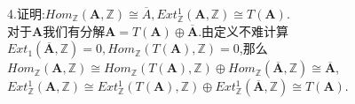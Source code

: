 \documentclass[b5paper]{ctexart}
\begin{document}
4.证明:$Hom_{\mathbb{Z}}(\mathbf{A},\mathbb{Z})\cong \overline{A},Ext_{\mathbb{Z}}^1(\mathbf{A},\mathbb{Z})\cong T(\mathbf{A})$.\\
对于$\mathbf{A}$我们有分解$\mathbf{A}=T(\mathbf{A})\oplus\overline{\mathbf{A}}$.由定义不难计算$Ext_1(\overline{\mathbf{A}},\mathbb{Z})=0,Hom_{\mathbb{Z}}(T\mathbf{(A)},\mathbb{Z})=0$,那么$Hom_{\mathbb{Z}}(\mathbf{A},\mathbb{Z})\cong Hom_{\mathbb{Z}}(T(\mathbf{A}),\mathbb{Z})\oplus Hom_{\mathbb{Z}}(\overline{\mathbf{A}},\mathbb{Z})\cong \overline{\mathbf{A}}$,\\
$Ext^1_{\mathbb{Z}}(\mathbf{A},\mathbb{Z})\cong Ext^1_{\mathbb{Z}}(T(\mathbf{A}),\mathbb{Z})\oplus Ext^1_{\mathbb{Z}}(\overline{\mathbf{A}},\mathbb{Z})\cong T(\mathbf{A}).$
\end{document}
